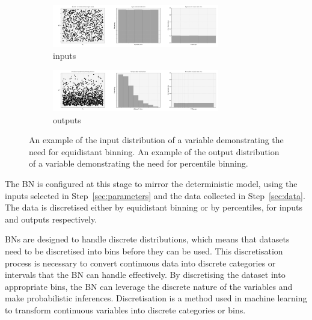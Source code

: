 \documentclass[journal]{IEEEtran}
\begin{document}
\begin{figure}[t]
    \centering
    \begin{minipage}{\textwidth}
        \begin{subfigure}{\textwidth}
            \centering
            \includegraphics[width=0.8\textwidth]{figures/methodology/input_discretisation.png}
            \caption{\small inputs}\label{fig:input_dist_eg}
        \end{subfigure}
    \end{minipage}
    \begin{minipage}{\textwidth}
        \begin{subfigure}{\textwidth}
            \centering
            \includegraphics[width=0.8\textwidth]{figures/methodology/output_discretisation.png}
            \caption{\small outputs}\label{fig:output_dist_eg}
        \end{subfigure}
    \end{minipage}
    \caption{\small An example of the input distribution of a variable demonstrating the need for equidistant binning. An example of the output distribution of a variable demonstrating the need for percentile binning.}\label{fig:dists_eg}
\end{figure}


The BN is configured at this stage to mirror the deterministic model, using the inputs selected in Step~\ref{sec:parameters} and the data collected in Step~\ref{sec:data}. The data is discretised either by equidistant binning or by percentiles, for inputs and outputs respectively.

BNs are designed to handle discrete distributions, which means that datasets need to be discretised into bins before they can be used. This discretisation process is necessary to convert continuous data into discrete categories or intervals that the BN can handle effectively. By discretising the dataset into appropriate bins, the BN can leverage the discrete nature of the variables and make probabilistic inferences. Discretisation is a method used in machine learning to transform continuous variables into discrete categories or bins.
\end{document}
